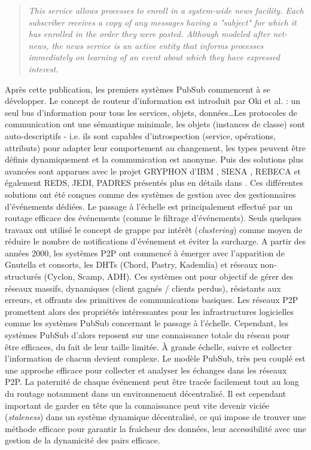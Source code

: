 \blockcquote{Birman1987}{
	\og\textit{ This service allows processes to enroll in a 
		system-wide news facility. Each subscriber receives a
		copy of any messages having a "subject" for which it 
		has enrolled in the order they were posted. Although 
		modeled after net-news, the news service is an active 
		entity that informs processes immediately on learning 
		of an event about which they have expressed interest.}\fg{}
}

Après cette publication, les premiers systèmes \gls{PubSub} commencent à 
se développer. Le concept de routeur d'information est introduit par Oki et al. 
\cite{Oki1993} : un seul bus d'information pour tous les services, objets, 
données\dots Les protocoles de communication ont une sémantique minimale, 
les objets (instances de classe) sont auto-descriptifs - i.e. ils sont 
capables d'introspection (service, opérations, attributs) pour adapter leur 
comportement au changement, les types peuvent être définis dynamiquement et 
la communication est anonyme. 
Puis des solutions plus avancées sont apparues avec le projet 
GRYPHON d'IBM \cite{Banavar1999}, SIENA \cite{Carzaniga2000}, REBECA 
\cite{Parzyjegla2010} et également REDS, JEDI, PADRES présentés plus en 
détails dans \cite{Tarkoma2012}.
Ces différentes solutions ont été conçues comme des systèmes de gestion avec 
des gestionnaires d'événements dédiées. Le passage à l'échelle est 
principalement effectué par un routage efficace des événements (comme le 
filtrage d'événements). Seuls quelques travaux ont utilisé le concept de grappe  
par intérêt (\textit{clustering}) comme moyen de réduire le nombre de 
notifications d'événement et éviter la surcharge. 
A partir des années 2000, les systèmes \gls{P2P} ont commencé à émerger avec 
l'apparition de Gnutella\cite{Ripeanu} et consorts, les \glspl{DHT} (Chord, Pastry, 
Kademlia) et  réseaux non-structurés (Cyclon, Scamp, ADH). 
Ces systèmes ont pour objectif de gérer des réseaux massifs, dynamiques 
(client gagnés / clients perdus), résistants aux erreurs, et offrants des primitives 
de communications basiques.
Les réseaux \gls{P2P} promettent alors des propriétés intéressantes pour les 
infrastructures logicielles comme les systèmes \gls{PubSub} concernant le 
passage à l'échelle. Cependant, les systèmes \gls{PubSub} d'alors reposent sur 
une connaissance 
totale du réseau pour être efficaces, du fait de leur taille limitée. À grande échelle, 
suivre et collecter l'information de chacun devient complexe. 
Le modèle \gls{PubSub}, très peu couplé est une approche efficace pour collecter et analyser 
les échanges dans les réseaux \gls{P2P}. La paternité de chaque événement peut être 
tracée facilement tout au long du routage notamment dans un environnement décentralisé.
Il est cependant important de garder en tête que la connaissance peut vite devenir 
viciée (\textit{staleness}) dans un système dynamique décentralisé, ce qui impose de trouver une méthode 
efficace pour garantir la fraîcheur des données, leur accessibilité avec une gestion 
de la dynamicité des pairs efficace.

